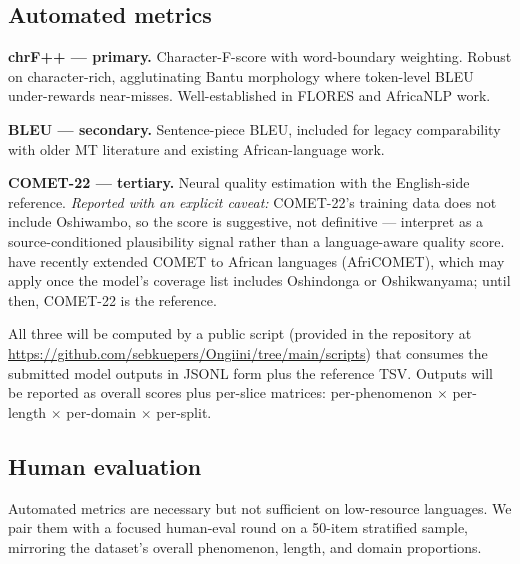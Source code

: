\documentclass[11pt]{article}
\begin{document}
\subsection{Automated metrics}

\textbf{chrF++ \citep{popovic2017chrf} --- primary.} Character-F-score
with word-boundary weighting. Robust on character-rich,
agglutinating Bantu morphology where token-level BLEU under-rewards
near-misses. Well-established in FLORES \citep{goyal2022flores} and
AfricaNLP work.

\textbf{BLEU \citep{papineni2002bleu} --- secondary.} Sentence-piece
BLEU, included for legacy comparability with older MT literature
and existing African-language work.

\textbf{COMET-22 \citep{rei2022comet22} --- tertiary.} Neural
quality estimation with the English-side reference. \emph{Reported
with an explicit caveat:} COMET-22's training data does not include
Oshiwambo, so the score is suggestive, not definitive --- interpret
as a source-conditioned plausibility signal rather than a
language-aware quality score. \citet{wang2024africomet} have
recently extended COMET to African languages
(AfriCOMET), which may apply once the model's coverage list
includes Oshindonga or Oshikwanyama; until then, COMET-22 is the
reference.

All three will be computed by a public script (provided in the
repository at \url{https://github.com/sebkuepers/Ongiini/tree/main/scripts})
that consumes the submitted model outputs in JSONL form plus the
reference TSV. Outputs will be reported as overall scores plus
per-slice matrices: per-phenomenon $\times$ per-length $\times$
per-domain $\times$ per-split.

\subsection{Human evaluation}
\label{sec:hum-eval}

Automated metrics are necessary but not sufficient on low-resource
languages. We pair them with a focused human-eval round on a
50-item stratified sample, mirroring the dataset's overall
phenomenon, length, and domain proportions.
\end{document}
